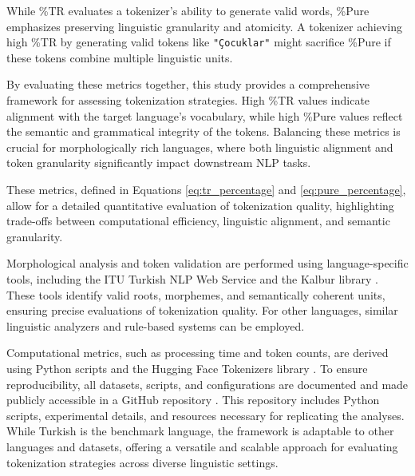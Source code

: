 While \%TR evaluates a tokenizer's ability to generate valid words, \%Pure emphasizes preserving linguistic granularity and atomicity. A tokenizer achieving high \%TR by generating valid tokens like \texttt{"Çocuklar"} might sacrifice \%Pure if these tokens combine multiple linguistic units.

By evaluating these metrics together, this study provides a comprehensive framework for assessing tokenization strategies. High \%TR values indicate alignment with the target language’s vocabulary, while high \%Pure values reflect the semantic and grammatical integrity of the tokens. Balancing these metrics is crucial for morphologically rich languages, where both linguistic alignment and token granularity significantly impact downstream NLP tasks.

These metrics, defined in Equations \ref{eq:tr_percentage} and \ref{eq:pure_percentage}, allow for a detailed quantitative evaluation of tokenization quality, highlighting trade-offs between computational efficiency, linguistic alignment, and semantic granularity.

Morphological analysis and token validation are performed using language-specific tools, including the ITU Turkish NLP Web Service \cite{eryigit_itu_2014} and the Kalbur library \cite{aksoy_ahmetaxkalbur_2024}. These tools identify valid roots, morphemes, and semantically coherent units, ensuring precise evaluations of tokenization quality. For other languages, similar linguistic analyzers and rule-based systems can be employed.

Computational metrics, such as processing time and token counts, are derived using Python scripts and the Hugging Face Tokenizers library \cite{neubeck_so_2024}. To ensure reproducibility, all datasets, scripts, and configurations are documented and made publicly accessible in a GitHub repository \cite{bayram_malibayramtokenizer_benchmark_2024}. This repository includes Python scripts, experimental details, and resources necessary for replicating the analyses. While Turkish is the benchmark language, the framework is adaptable to other languages and datasets, offering a versatile and scalable approach for evaluating tokenization strategies across diverse linguistic settings.